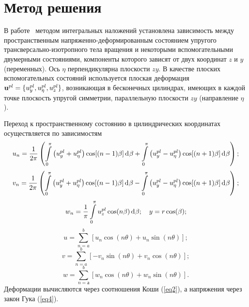 \documentclass[press]{vestnik}
\begin{document}
\section{Метод решения}

В работе~\cite{B12} методом интегральных наложений установлена зависимость между 
пространственным напряженно-деформированным состоянием упругого 
трансверсально-изотропного тела вращения и некоторыми вспомогательными 
двумерными состояниями, компоненты которого зависят от двух координат $z$ и $y$ 
(переменных). Ось $\eta $ перпендикулярна плоскости $zy$. В качестве плоских 
вспомогательных состояний используется плоская деформация ${\rm {\bf 
u}}^{pl}=\{u_{y}^{pl} ,u_{\eta }^{pl} ,u_{z}^{pl} \}$, возникающая в 
бесконечных цилиндрах, имеющих в каждой точке плоскость упругой симметрии, 
параллельную плоскости $zy$ (направление $\eta$).

Переход к пространственному состоянию в цилиндрических координатах 
осуществляется по зависимостям
\[
u_{n} =\frac{1}{2\pi }\left(\int\limits_0^\pi {\left(u_{y}^{pl} +u_{\eta }^{pl} \right)\cos 
[(n-1)\beta ]\d\beta } +\int\limits_0^\pi {\left(u_{y}^{pl} -u_{\eta }^{pl} \right)\cos 
[(n+1)\beta ]\d\beta } \right);
\]
\begin{equation}
\label{eq6}
v_{n} =\frac{1}{2\pi }\left(\int\limits_0^\pi {\left(u_{y}^{pl} +u_{\eta }^{pl} \right)\cos 
[(n-1)\beta ]\d\beta } -\int\limits_0^\pi {\left(u_{y}^{pl} -u_{\eta }^{pl} \right)\cos 
[(n+1)\beta ]\d\beta } \right);
\end{equation}
\[
w_{n} =\frac{1}{\pi }\int\limits_0^\pi {u_{z}^{pl} \cos (n\beta )\d\beta } ;
\quad
y=r\cos (\beta );
\]
\[
u=\sum\limits_{n=a}^b {[u_{n} \cos (n\theta )+u_{n} \sin (n\theta )]} ;
\]
\begin{equation}
\label{eq7}
v=\sum\limits_{n=a}^b {[-v_{n} \sin (n\theta )+v_{n} \cos (n\theta )]} ;
\end{equation}
\[
w=\sum\limits_{n=а}^b {[w_{n} \cos (n\theta )+w_{n} \sin (n\theta )]} .
\]
Деформации вычисляются через соотношения Коши (\ref{eq2}), а напряжения через закон 
Гука (\ref{eq4}).
\end{document}
